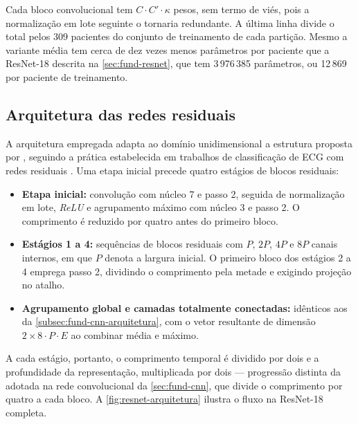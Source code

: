 Cada bloco convolucional tem $C \cdot C' \cdot \kappa$ pesos, sem termo de
viés, pois a normalização em lote seguinte o tornaria redundante. A última
linha divide o total pelos 309 pacientes do conjunto de treinamento de cada
partição. Mesmo a variante média tem cerca de dez vezes menos parâmetros por
paciente que a ResNet-18 descrita na \autoref{sec:fund-resnet}, que tem 3\,976\,385
parâmetros, ou 12\,869 por paciente de treinamento.



\subsection{Arquitetura das redes residuais}
\label{subsec:fund-resnet-arquitetura}

A arquitetura empregada adapta ao domínio unidimensional a estrutura proposta
por , seguindo a prática estabelecida em trabalhos de
classificação de \gls{ECG} com redes residuais
\cite{hannun2019cardiologist,ribeiro2020automatic}. Uma etapa inicial
precede quatro estágios de blocos residuais:

\begin{itemize}
	\item \textbf{Etapa inicial:} convolução com núcleo 7 e passo 2, seguida
	      de normalização em lote, \textit{ReLU} e agrupamento máximo com núcleo 3 e
	      passo 2. O comprimento é reduzido por quatro antes do primeiro bloco.
	\item \textbf{Estágios 1 a 4:} sequências de blocos residuais com $P$,
	      $2P$, $4P$ e $8P$ canais internos, em que $P$ denota a largura inicial.
	      O primeiro bloco dos estágios 2 a 4 emprega passo 2, dividindo o
	      comprimento pela metade e exigindo projeção no atalho.
	\item \textbf{Agrupamento global e camadas totalmente conectadas:} idênticos aos da
	      \autoref{subsec:fund-cnn-arquitetura}, com o vetor resultante de
	      dimensão $2 \times 8 \cdot P \cdot E$ ao combinar média e máximo.
\end{itemize}

A cada estágio, portanto, o comprimento temporal é dividido por dois e a
profundidade da representação, multiplicada por dois --- progressão distinta
da adotada na rede convolucional da \autoref{sec:fund-cnn}, que divide o
comprimento por quatro a cada bloco. A \autoref{fig:resnet-arquitetura} ilustra o fluxo na ResNet-18
completa.

